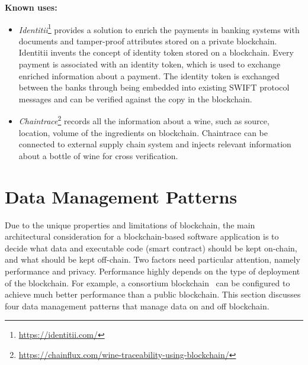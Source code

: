 \vspace{0.5em}\noindent \textbf{Known uses:}
\begin{itemize}
  \item \textit{Identitii}\footnote{\url{https://identitii.com/}} provides a solution to enrich the payments in banking systems with documents and tamper-proof attributes stored on a private blockchain. Identitii invents the concept of identity token stored on a blockchain. Every payment is associated with an identity token, which is used to exchange enriched information about a payment. The identity token is exchanged between the banks through being embedded into existing SWIFT protocol messages and can be verified against the copy in the blockchain. 
  \item \textit{Chaintrace}\footnote{\url{https://chainflux.com/wine-traceability-using-blockchain/}} records all the information about a wine, such as source, location, volume of the ingredients on blockchain. Chaintrace can be connected to external supply chain system and injects relevant information about a bottle of wine for cross verification.
\end{itemize}



\section{Data Management Patterns}
\label{sec:datamanagement}

Due to the unique properties and limitations of blockchain, the main architectural consideration for a blockchain-based software application is to decide what data and executable code (smart contract) should be kept on-chain, and what should be kept off-chain. Two factors need particular attention, namely performance and privacy. Performance highly depends on the type of deployment of the blockchain. For example, a consortium blockchain~\cite{Sherry:ICSA2017} can be configured to achieve much better performance than a public blockchain. This section discusses four data management patterns that manage data on and off blockchain. 


